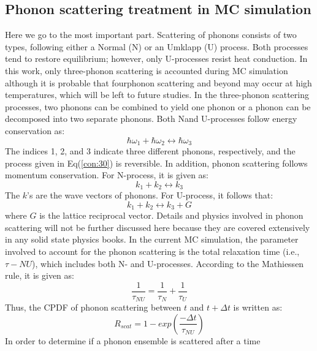 \subsection*{Phonon scattering treatment in MC simulation}
Here we go to the most important part. Scattering of phonons consists of two types, following either a
Normal (N) or an Umklapp (U) process\cite{Ashcroft,Ziman,zimanphonons}.
Both processes
tend to restore equilibrium; however, only U-processes resist heat
conduction. In this work, only three-phonon scattering is accounted
during MC simulation although it is probable that fourphonon
scattering and beyond may occur at high temperatures,
which will be left to future studies. In the three-phonon scattering
processes, two phonons can be combined to yield one phonon or a
phonon can be decomposed into two separate phonons. Both Nand
U-processes follow energy conservation as:
\begin{equation}
\hbar \omega_1 + \hbar \omega_2 \leftrightarrow \hbar \omega_3 \label{con:30}
\end{equation}
The indices 1, 2, and 3 indicate three different phonons, respectively,
and the process given in Eq(\ref{con:30}) is reversible.
In addition,
phonon scattering follows momentum conservation. For N-process,
it is given as:
\begin{equation}
k_1 + k_2 \leftrightarrow k_3
\end{equation}
The $k$'s are the wave vectors of phonons. For U-process, it follows that:
\begin{equation}
k_1 + k_2 \leftrightarrow k_3 + G
\end{equation}
where $G$ is the lattice reciprocal vector. Details and physics involved
in phonon scattering will not be further discussed here because
they are covered extensively in any solid state physics books.
\indent In the current MC simulation, the parameter involved to account
for the phonon scattering is the total relaxation time (i.e.,
$\tau-{NU}$), which includes both N- and U-processes. According to the
Mathiessen rule, it is given as\cite{Ashcroft,zimanphonons}:
\begin{equation}
\frac{1}{\tau_{NU}}=\frac{1}{\tau_{N}}+\frac{1}{\tau_{U}}
\end{equation}
Thus, the CPDF of phonon scattering between $t$ and $t + \Delta t$ is written as:
\begin{equation}
R_{scat} = 1- exp (\frac{- \Delta t}{\tau_{NU}})
\end{equation}
In order to determine if a phonon ensemble is scattered after a time
